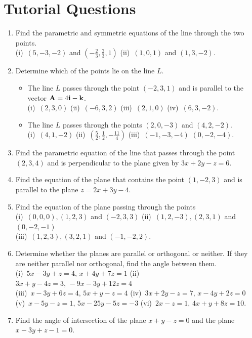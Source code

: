 \documentclass[titlepage,a4paper,12pt]{report}
\begin{document}
\section{Tutorial Questions}
\begin{enumerate}
\item Find the parametric and symmetric equations of the line through the two points.\\
(i)\,  $(5,-3,-2)$ and $(-\frac{2}{3}, \frac{2}{3},1)$ \quad (ii)\, $(1,0,1)$ and $(1,3,-2)$.
\item Determine which of the points lie on the line $L$.
\begin{itemize}
\item[(a)] The line $L$ passes through the point $(-2,3,1)$ and is parallel to the vector ${\bf{A}}=4{\bf{i}}-{\bf{k}}$.  \\
(i)\, $(2,3,0)$ \quad (ii)\, $(-6,3,2)$ \quad (iii)\, $(2,1,0)$ \quad (iv)\, $(6,3,-2)$.
\item[(b)] The line $L$ passes through the points $(2,0,-3)$ and $(4,2,-2)$.\\
(i)\, $(4,1,-2)$ \quad (ii)\, $(\frac{5}{2}, \frac{1}{2}, -\frac{11}{4})$ \quad (iii)\, $(-1, -3, -4)$ \quad $(0,-2,-4)$.
\end{itemize}
\item Find the parametric equation of the line that passes through the point $(2,3,4)$ and is perpendicular to the plane given by $3x+2y-z=6$.
\item Find the equation of the plane that contains the point $(1,-2,3)$ and is parallel to the plane $z=2x+3y-4$.
\item Find the equation of the plane passing through the points\\
(i)\, $(0,0,0), (1,2,3)$ and $(-2,3,3)$ \quad (ii)\, $(1,2,-3), (2,3,1)$ and $(0,-2,-1)$ \\
(iii)\, $(1,2,3), (3,2,1)$ and $(-1,-2,2)$.
\item Determine whether the planes are parallel or orthogonal or neither. If they are neither parallel nor orthogonal, find the angle between them.\\
(i)\, $5x-3y+z=4,\,  x+4y+7z=1$ \quad (ii)\, $3x+y-4z=3, \, -9x-3y+12z=4$\\
(iii)\, $x-3y+6z=4, \, 5x+y-z=4$ \quad (iv)\, $3x+2y-z=7, \, x-4y+2z=0$\\
(v)\, $x-5y-z=1, \, 5x-25y-5z=-3 $ \quad (vi)\, $2x-z=1, \, 4x+y+8z=10$.
\item Find the angle of intersection of the plane $x+y-z=0$ and the plane $x-3y+z-1=0$.

\end{enumerate}
\end{document}

